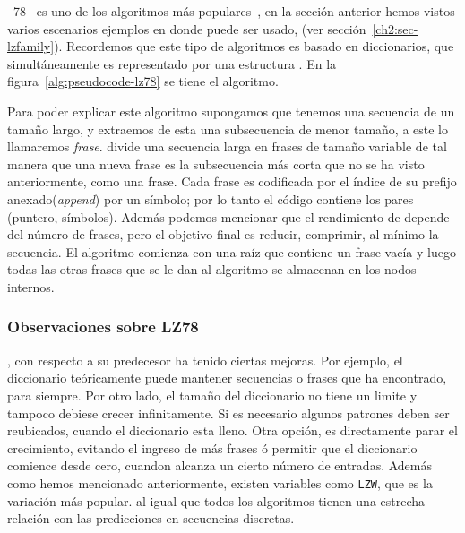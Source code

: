 % 
% 
%
%
\lempelziv~78~\cite{ZivLempel1978} es uno de los algoritmos \LDC más populares~\cite{Begleiter2004}, en la sección anterior hemos vistos varios escenarios ejemplos en donde puede ser usado, (ver sección~\ref{ch2:sec-lzfamily}). Recordemos que este tipo de algoritmos es basado en diccionarios, que simultáneamente es representado por una estructura \trie. En la figura~\ref{alg:pseudocode-lz78} se tiene el algoritmo.



Para poder explicar este algoritmo supongamos que tenemos una secuencia de un tamaño largo, y extraemos de esta una subsecuencia de menor tamaño, a este lo llamaremos \emph{frase}. \lzSieteOcho divide una secuencia larga en frases de tamaño variable de tal manera que una nueva frase es la subsecuencia más corta que no se ha visto anteriormente, como una frase. Cada frase es codificada por el índice de su prefijo anexado(\emph{append}) por un símbolo; por lo tanto el código \lzSieteOcho contiene los pares (puntero, símbolos). Además podemos mencionar que el  rendimiento de \lzSieteOcho depende del número de frases, pero el objetivo final es reducir, comprimir, al mínimo la secuencia. El algoritmo comienza con una raíz que contiene un frase vacía y luego todas las otras frases que se le dan al algoritmo se almacenan en los nodos internos. 



\subsubsection{Observaciones sobre LZ78}

\lzSieteOcho, con respecto a su predecesor ha tenido ciertas mejoras. Por ejemplo, el diccionario teóricamente puede mantener secuencias o frases que ha encontrado, para siempre. Por otro lado,  el tamaño del diccionario no tiene un limite y tampoco  debiese crecer infinitamente. Si es necesario algunos patrones deben ser reubicados, cuando el diccionario esta lleno. Otra opción, es directamente parar el crecimiento, evitando el ingreso de más frases ó permitir que el diccionario comience desde cero, cuandon alcanza un cierto número de entradas. Además como hemos mencionado anteriormente, existen variables como \texttt{LZW}, que es la variación más popular. 
\lzSieteOcho al igual que todos los algoritmos \losslessdatacompression tienen una estrecha relación con las predicciones en secuencias discretas.

